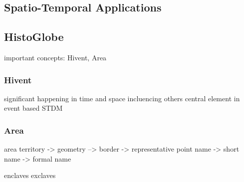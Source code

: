 \subsection{Spatio-Temporal Applications} %
\label{sub:spatio_temporal_applications}




\subsection{HistoGlobe} %
\label{sub:histoglobe}



important concepts: Hivent, Area

\subsubsection{Hivent} %
\label{ssub:hivent}

significant happening in time and space
incluencing others
central element in event based STDM



\subsubsection{Area} %
\label{ssub:area}

area
territory
-> geometry
--> border
-> representative point
name
-> short name
-> formal name

enclaves
exclaves






